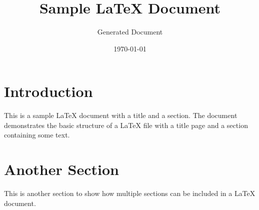 \documentclass{article}
\title{Sample LaTeX Document}
\author{Generated Document}
\date{\today}
\begin{document}
\maketitle

\section{Introduction}
This is a sample LaTeX document with a title and a section. The document demonstrates the basic structure of a LaTeX file with a title page and a section containing some text.

\section{Another Section}
This is another section to show how multiple sections can be included in a LaTeX document.
\end{document}
